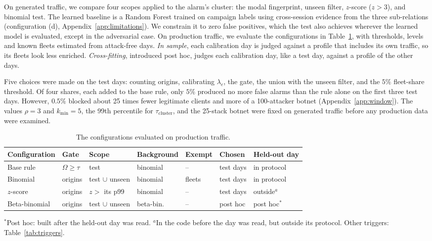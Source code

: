 \documentclass[conference,letterpaper,10pt]{IEEEtran}
\newcommand\1{\textit{(i)}}
\newcommand\2{\textit{(ii)}}
\newcommand\3{\textit{(iii)}}
\newcommand\4{\textit{(iv)}}
\newcommand\5{\textit{(v)}}
\newcommand\6{\textit{(vi)}}
\newcommand\7{\textit{(vii)}}
\newcommand\8{\textit{(viii)}}
\newcommand\9{\textit{(ix)}}
\begin{document}
On generated traffic, we compare four scopes
applied to the alarm's cluster: the modal
fingerprint, unseen filter, $z$-score ($z > 3$),
and binomial test. The learned baseline is a
Random Forest trained on campaign labels using
cross-session evidence from the three sub-relations
(configuration (d), Appendix~\ref{app:limitations}).
We constrain it to zero false positives, which the test also
achieves wherever the
learned model is evaluated, except in the
adversarial case. On production traffic, we evaluate the
configurations in Table~\ref{tab:configs}, with thresholds,
levels and known fleets estimated from attack-free days.
\textit{In sample}, each calibration day is judged against a
profile that includes its own traffic, so its fleets look
less enriched. \textit{Cross-fitting}, introduced post hoc,
judges each calibration day, like a test day, against a
profile of the other days.

Five choices were made on the test days:
counting origins, calibrating $\lambda_e$,
the gate, the union with the unseen filter,
and the $5\%$ fleet-share threshold.
Of four shares, each added to the base rule, only $5\%$
produced no more false alarms
than the rule alone on the first three test days.
However, $0.5\%$ blocked about 25 times fewer legitimate
clients and more of a 100-attacker botnet
(Appendix~\ref{app:window}).
The values $\rho = 3$ and $k_{\min} = 5$,
the 99th percentile for $\tau_{\mathrm{cluster}}$,
and the 25-stack botnet were fixed on generated
traffic before any production data were examined.

\begin{table}[t]
\centering
\caption{The configurations evaluated on production traffic.}
\label{tab:configs}
\scriptsize
\setlength{\tabcolsep}{2pt}
\begin{tabular}{@{}lllllll@{}}
\toprule
\textbf{Configuration} & \textbf{Gate} & \textbf{Scope} & \textbf{Background} & \textbf{Exempt} & \textbf{Chosen} & \textbf{Held-out day} \\
\midrule
Base rule     & $\Omega \geq \tau$ & test               & binomial  & --             & test days       & in protocol \\
Binomial      & origins            & test $\cup$ unseen & binomial  & fleets         & test days       & in protocol \\
$z$-score     & origins            & $z >$ its p99      & binomial  & --             & test days       & outside$^{a}$ \\
Beta-binomial & origins            & test $\cup$ unseen & beta-bin. & --             & post hoc        & post hoc$^{*}$ \\
\bottomrule
\end{tabular}

\vspace{2pt}
{\footnotesize $^{*}$Post hoc: built after the held-out day was read. $^{a}$In the code before the day was read, but outside its protocol. Other triggers: Table~\ref{tab:triggers}.}
\end{table}
\end{document}
